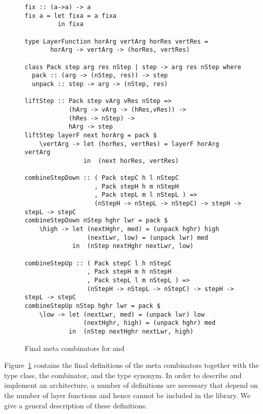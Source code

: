 \begin{figure}
\begin{small}
\begin{center}
\begin{footnotesize}
\begin{verbatim}
fix :: (a->a) -> a
fix a = let fixa = a fixa
         in fixa

type LayerFunction horArg vertArg horRes vertRes =
       horArg -> vertArg -> (horRes, vertRes)

class Pack step arg res nStep | step -> arg res nStep where
  pack :: (arg -> (nStep, res)) -> step
  unpack :: step -> arg -> (nStep, res)

liftStep :: Pack step vArg vRes nStep => 
            (hArg -> vArg -> (hRes,vRes)) ->
            (hRes -> nStep) ->
            hArg -> step
liftStep layerF next horArg = pack $
    \vertArg -> let (horRes, vertRes) = layerF horArg vertArg
                in  (next horRes, vertRes)                    

combineStepDown :: ( Pack stepC h l nStepC 
                   , Pack stepH h m nStepH
                   , Pack stepL m l nStepL ) => 
                   (nStepH -> nStepL -> nStepC) -> stepH -> stepL -> stepC
combineStepDown nStep hghr lwr = pack $
    \high -> let (nextHghr, med) = (unpack hghr) high
                 (nextLwr, low) = (unpack lwr) med
             in  (nStep nextHghr nextLwr, low)

combineStepUp :: ( Pack stepC l h nStepC 
                 , Pack stepH m h nStepH
                 , Pack stepL l m nStepL ) => 
                 (nStepH -> nStepL -> nStepC) -> stepH -> stepL -> stepC
combineStepUp nStep hghr lwr = pack $
    \low -> let (nextLwr, med) = (unpack lwr) low
                (nextHghr, high) = (unpack hghr) med
            in  (nStep nextHghr nextLwr, high)
\end{verbatim}
\end{footnotesize}\caption{Final meta combinators for  and }\label{metacombinators} 
\end{center}
\end{small}
\end{figure}


Figure~\ref{metacombinators} contains the final definitions of the meta combinators together with the  type class, the  combinator, and the  type synonym. In order to describe and implement an architecture, a number of definitions are necessary that depend on the number of layer functions and hence cannot be included in the library. We give a general description of these definitions.


